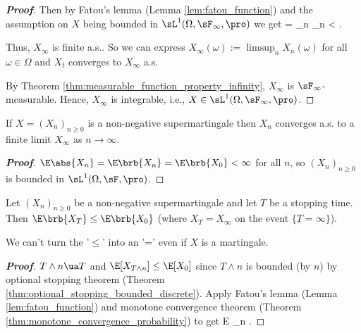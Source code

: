 \begin{proof}[\bf Proof]
Then by Fatou's lemma (Lemma \ref{lem:fatou_function}) and the assumption on $X$ being bounded in $\sL^1(\Omega,\sF_\infty,\pro)$ we get \be \E{} = \E {} \leq \liminf_n \E{} \leq
\sup_n \E{} < \infty. \ee

Thus, $X_\infty$ is finite a.s.. So we can express $X_\infty(\omega) := \limsup_n X_n(\omega)$ for all $\omega\in \Omega$ and $X_t$ converges to $X_\infty$ a.s.

By Theorem \ref{thm:measurable_function_property_infinity}, $X_\infty$ is $\sF_{\infty}$-measurable. Hence, $X_\infty$ is integrable, i.e., $X\in \sL^1(\Omega,\sF_\infty,\pro)$. %
\end{proof}

\begin{corollary}
If $X = (X_n)_{n \geq 0}$ is a non-negative supermartingale then $X_n$ converges a.s. to a finite limit $X_\infty$ as $n\to \infty$.
\end{corollary}

\begin{proof}[\bf Proof]
$\E\abs{X_n} = \E\brb{X_n} = \E\brb{X_0} <\infty$ for all $n$, so $(X_n)_{n \geq 0}$ is bounded in $\sL^1(\Omega,\sF,\pro)$.
\end{proof}


\begin{corollary}
Let $(X_n)_{n \geq 0}$ be a non-negative supermartingale and let $T$ be a stopping time. Then $\E\brb{X_T} \leq \E\brb{X_0}$ (where $X_T = X_\infty$ on the event $\{T = \infty\}$).
\end{corollary}

\begin{remark}
We can't turn the '$\leq$' into an '=' even if $X$ is a martingale. %
\end{remark}

\begin{proof}[\bf Proof]
$T \land n \ua T$ and $\E[X_{T\land n}] \leq \E[X_0]$ since $T \land n$ is bounded (by $n$) by optional stopping theorem (Theorem \ref{thm:optional_stopping_bounded_discrete}). Apply Fatou's lemma (Lemma \ref{lem:fatou_function}) and monotone convergence theorem (Theorem \ref{thm:monotone_convergence_probability}) to get
\be
E \geq \liminf_{n\to \infty} \E{} \geq \E{} \ua  \E{}.
\ee
\end{proof}


